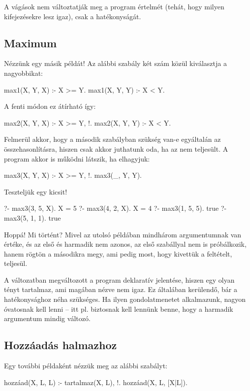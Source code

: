 A vágások nem változtatják meg a program értelmét
(tehát, hogy milyen kifejezésekre lesz igaz), csak a
hatékonyságát.

\subsection*{Maximum}
Nézzünk egy másik példát! Az alábbi szabály két szám
közül kiválasztja a nagyobbikat:
\begin{program}
max1(X, Y, X) :- X >= Y.
max1(X, Y, Y) :- X < Y.
\end{program}
A fenti módon ez átírható így:
\begin{program}
max2(X, Y, X) :- X >= Y, !.
max2(X, Y, Y) :- X < Y.
\end{program}

Felmerül akkor, hogy a második szabályban szükség
van-e egyáltalán az  összehasonlításra,
hiszen csak akkor juthatunk oda, ha az 
nem teljesült. A program akkor is működni látszik,
ha elhagyjuk:
\begin{program}
max3(X, Y, X) :- X >= Y, !.
max3(_, Y, Y).
\end{program}

Teszteljük egy kicsit!
\begin{query}
?- max3(3, 5, X).
X = 5
?- max3(4, 2, X).
X = 4
?- max3(1, 5, 5).
true
?- max3(5, 1, 1). %
true
\end{query}

Hoppá! Mi történt?  Mivel az utolsó példában
mindhárom argumentumnak van értéke, és az első és
harmadik nem azonos, az első szabállyal nem is
próbálkozik, hanem rögtön a másodikra megy, ami
pedig most, hogy kivettük a feltételt, teljesül.

A  változatban megváltozott a program
deklaratív jelentése, hiszen egy olyan tényt
tartalmaz, ami magában nézve nem igaz. Ez általában
kerülendő, bár a hatékonysághoz néha szükséges. Ha
ilyen gondolatmenetet alkalmazunk, nagyon óvatosnak
kell lenni -- itt pl. biztosnak kell lennünk benne,
hogy a harmadik argumentum mindig változó.

\subsection*{Hozzáadás halmazhoz}
Egy további példaként nézzük meg az alábbi szabályt:

\begin{program}
hozzáad(X, L, L) :- tartalmaz(X, L), !.
hozzáad(X, L, [X|L]).
\end{program}

